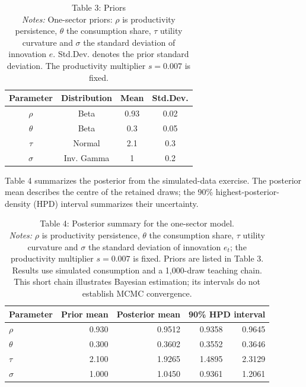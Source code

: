\documentclass[12pt]{article}
\begin{document}
\begin{table}[!htbp]
\begin{center}
\begin{tabular}{cccc}
\hline\hline
Parameter & Distribution & Mean & Std.Dev. \\
\hline
$\rho$ & Beta & 0.93 & 0.02 \\
$\theta$ & Beta & 0.3 & 0.05 \\
$\tau$ & Normal & 2.1 & 0.3 \\
$\sigma$ & Inv. Gamma & 1 & 0.2 \\
\hline\hline
\end{tabular}
\captionsetup{labelformat=empty}
\caption{Table 3: Priors\\ \footnotesize\textit{Notes:} One-sector priors: $\rho$ is productivity persistence, $\theta$ the consumption share, $\tau$ utility curvature and $\sigma$ the standard deviation of innovation $e$. Std.Dev. denotes the prior standard deviation. The productivity multiplier $s=0.007$ is fixed.}
\end{center}
\end{table}


Table 4 summarizes the posterior from the simulated-data exercise. The posterior mean describes the centre of the retained draws; the 90\% highest-posterior-density (HPD) interval summarizes their uncertainty.

\begin{table}[!htbp]
\centering
\begin{tabular}{lrrrr}
\hline
Parameter & Prior mean & Posterior mean & \multicolumn{2}{c}{90\% HPD interval} \\
\hline
$\rho$ & 0.930 & 0.9512 & 0.9358 & 0.9645 \\
$\theta$ & 0.300 & 0.3602 & 0.3552 & 0.3646 \\
$\tau$ & 2.100 & 1.9265 & 1.4895 & 2.3129 \\
$\sigma$ & 1.000 & 1.0450 & 0.9361 & 1.2061 \\
\hline
\end{tabular}
\captionsetup{labelformat=empty}
\caption{Table 4: Posterior summary for the one-sector model.\\ \footnotesize\textit{Notes:} $\rho$ is productivity persistence, $\theta$ the consumption share, $\tau$ utility curvature and $\sigma$ the standard deviation of innovation $e_t$; the productivity multiplier $s=0.007$ is fixed. Priors are listed in Table 3. Results use simulated consumption and a 1,000-draw teaching chain. This short chain illustrates Bayesian estimation; its intervals do not establish MCMC convergence.}
\end{table}
\end{document}
